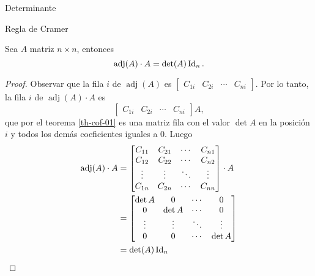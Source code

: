 \begin{chapter}{Determinante}
\begin{section}{Regla de Cramer}
                 \begin{teorema} Sea $A$ matriz $n \times n$,  entonces
                     \begin{equation*}
                     \operatorname{adj}(A)\cdot A = \det(A)\operatorname{Id}_n.
                     \end{equation*}
                 \end{teorema}
                 \begin{proof}
                     Observar que la fila $i$ de $\operatorname{adj}(A)$ es $\begin{bmatrix} C_{1i} & C_{2i} & \cdots & C_{ni}\end{bmatrix}$. Por lo tanto, la fila $i$ de $\operatorname{adj}(A)\cdot A$ es
                     $$
                     \begin{bmatrix} C_{1i} & C_{2i} & \cdots & C_{ni}\end{bmatrix} A,
                     $$ 
                     que por el teorema \ref{th-cof-01} es una matriz fila con el valor $\det A$ en la posición $i$ y todos los demás coeficientes iguales a 0. Luego
                     \begin{align*}
                        \operatorname{adj}(A)\cdot A &= 
                        \begin{bmatrix} C_{11} & C_{21} & \cdots & C_{n1}\\
                        C_{12} & C_{22} & \cdots & C_{n2} \\
                        \vdots & \vdots & \ddots & \vdots \\
                        C_{1n} & C_{2n} & \cdots & C_{nn}\end{bmatrix}\cdot  A\\
                        & = 
                        \begin{bmatrix}\det A & 0 & \cdots & 0\\
                        0 & \det A & \cdots & 0 \\
                        \vdots & \vdots & \ddots & \vdots \\
                        0 & 0 & \cdots & \det A\end{bmatrix} \\
                        &= \det(A) \operatorname{Id}_n
                     \end{align*}
                 \end{proof}
                 

\end{section}
\end{chapter}
